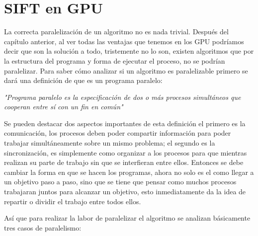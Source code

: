 \chapter{ SIFT en GPU}

La correcta paralelización de un algoritmo no es nada trivial. Después del capítulo anterior, al ver todas las ventajas que tenemos en los GPU podríamos decir que son la solución a todo, tristemente no lo son, existen algoritmos que por la estructura del programa y forma de ejecutar el proceso, no se podrían paralelizar. Para saber cómo analizar si un algoritmo es paralelizable primero se dará una definición de que es un programa paralelo:

\begin{center}
\textit{"Programa paralelo es la especificación de dos o más procesos simultáneos que cooperan entre sí con un fin en común"}
\end{center}

Se pueden destacar dos aspectos importantes de esta definición el primero es la comunicación, los procesos deben poder compartir información  para poder trabajar simultáneamente sobre un mismo problema; el segundo es la sincronización, es simplemente como organizar a los procesos para que mientras realizan su parte de trabajo sin que se interfieran entre ellos.
Entonces se debe cambiar la forma en que se hacen los programas, ahora no solo es el como llegar a un objetivo paso a paso, sino  que se tiene que pensar como muchos procesos trabajaran juntos para alcanzar un objetivo, esto inmediatamente  da la idea de repartir o dividir el trabajo entre todos ellos. 

\pagebreak

Así que para realizar la labor de paralelizar el algoritmo se analizan básicamente tres casos de paralelismo:
 

